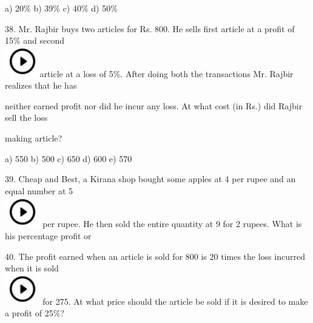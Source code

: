 \documentclass{article} %
\begin{document}
\noindent a) 20\%                    b) 39\%              c) 40\%              d) 50\%

38. Mr. Rajbir buys two articles for Rs. 800. He sells first article at a profit of 15\% and second  
\noindent \\ \includegraphics*[width=0.60in, height=0.52in]{images/image1}article at a loss of 5\%. After doing both the transactions Mr. Rajbir realizes that he has

\noindent neither earned profit nor did he incur any loss. At what cost (in Rs.) did Rajbir sell the loss

\noindent 

\noindent making article?

\noindent 

\noindent a) 550                      b) 500               c) 650                d) 600               e) 570

\noindent 

\noindent 

\noindent 

39. Cheap and Best, a Kirana shop bought some apples at 4 per rupee and an equal number at 5  
\noindent \\ \includegraphics*[width=0.60in, height=0.52in]{images/image1} per rupee. He then sold the entire quantity at 9 for 2 rupees. What is his percentage profit or

\noindent 

\noindent 

\noindent 

\noindent 

\noindent 

40. The profit earned when an article is sold for 800 is 20 times the loss incurred when it is sold  
\noindent \\ \includegraphics*[width=0.60in, height=0.52in]{images/image1} for 275. At what price should the article be sold if it is desired to make a profit of 25\%?
\end{document}
